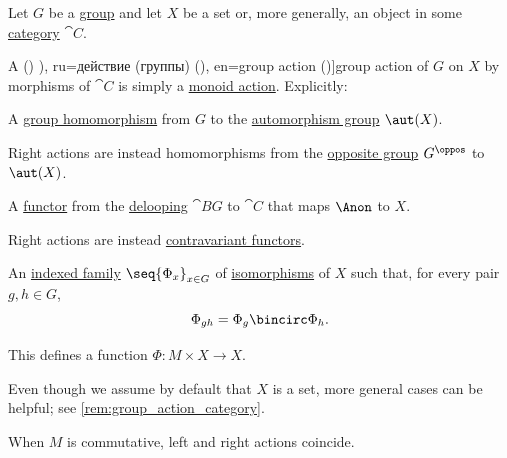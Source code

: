 \begin{definition}\label{def:group_action}\mimprovised
  Let \( G \) be a \hyperref[def:group]{group} and let \( X \) be a set or, more generally, an object in some \hyperref[def:category]{category} \( \cat{C} \).

  A () \term[bg=действие (на група) (\cite[def. IV.18]{ГеновМиховскиМоллов1991Алгебра}), ru=действие (группы) (\cite[98]{Тыртышников2017ОсновыАлгебры}), en=group action (\cite[108]{Aluffi2009Algebra})]{group action} of \( G \) on \( X \) by morphisms of \( \cat{C} \) is simply a \hyperref[def:monoid_action]{monoid action}. Explicitly:
  \begin{thmenum}
     A \hyperref[def:group/morphism]{group homomorphism} from \( G \) to the \hyperref[def:automorphism_group]{automorphism group} \( \aut(X) \).

    Right actions are instead homomorphisms from the \hyperref[def:group/opposite]{opposite group} \( G^\oppos \) to \( \aut(X) \).

     A \hyperref[def:functor]{functor} from the \hyperref[def:monoid_delooping]{delooping} \( \cat{B} G \) to \( \cat{C} \) that maps \( \Anon \) to \( X \).

    Right actions are instead \hyperref[def:contravariant_functor]{contravariant functors}.

     An \hyperref[def:indexed_family]{indexed family} \( \seq{ \Phi_x }_{x \in G} \) of \hyperref[def:morphism_invertibility/isomorphism]{isomorphisms} of \( X \) such that, for every pair \( g, h \in G \),
    \begin{equation}\label{eq:def:group_action/family/compatibility}
      \Phi_{gh} = \Phi_g \bincirc \Phi_h.
    \end{equation}

    This defines a function \( \Phi: M \times X \to X \).
  \end{thmenum}
\end{definition}
\begin{comments}
  \item Even though we assume by default that \( X \) is a set, more general cases can be helpful; see \cref{rem:group_action_category}.
  \item When \( M \) is commutative, left and right actions coincide.
\end{comments}

